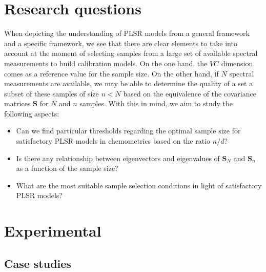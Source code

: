 \documentclass[journal=ancham,manuscript=article]{achemso}
\begin{document}
\section*{Research questions}

When depicting the understanding of PLSR models from a general framework and a specific framework, we see that there are clear elements to take into account at the moment of selecting samples from a large set of available spectral measurements to build calibration models. On the one hand, the $VC$ dimension comes as a reference value for the sample size. On the other hand, if $N$ spectral measurements are available, we may be able to determine the quality of a set a subset of these samples of size $n<N$ based on the equivalence of the covariance matrices $\mathbf{S}$ for $N$ and $n$ samples. With this in mind, we aim to study the following aspects:

\begin{itemize}
    \item Can we find particular thresholds regarding the optimal sample size for satisfactory PLSR models in chemometrics based on the ratio $n/d$?

    \item Is there any relationship between eigenvectors and eigenvalues of $\mathbf{S}_N$ and $\mathbf{S}_n$ as a function of the sample size?
    
    \item What are the most suitable sample selection conditions in light of satisfactory PLSR models?
\end{itemize}


\section*{Experimental}\label{experimental}

\subsection*{Case studies}\label{data}
\end{document}
